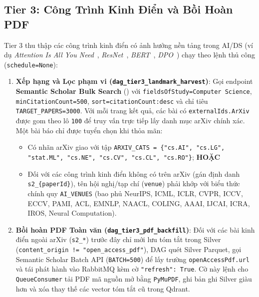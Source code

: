 \subsection{Tier 3: Công Trình Kinh Điển và Bồi Hoàn PDF}
\label{sec:ch2_tier3}

Tier 3 thu thập các công trình kinh điển có ảnh hưởng nền tảng trong AI/DS (ví dụ \textit{Attention Is All You Need}~\cite{vaswani2017attention}, \textit{ResNet}~\cite{he2016deep}, \textit{BERT}~\cite{devlin2019bert}, \textit{DPO}~\cite{rafailov2023direct}) chạy theo lệnh thủ công (\texttt{schedule=None}):
\begin{enumerate}[label=\textbf{\arabic*.}]
  \item \textbf{Xếp hạng và Lọc phạm vi (\texttt{dag\_tier3\_landmark\_harvest})}: Gọi endpoint \textbf{Semantic Scholar Bulk Search} () với \texttt{fieldsOfStudy=Computer Science}, \texttt{minCitationCount=500}, \texttt{sort=citationCount:desc} và chỉ tiêu \texttt{TARGET\_PAPERS=3000}. Với mỗi trang kết quả, các bài có \texttt{externalIds.ArXiv} được gom theo lô \texttt{100} để truy vấn trực tiếp  lấy danh mục arXiv chính xác. Một bài báo chỉ được tuyển chọn khi thỏa mãn:
    \begin{itemize}
      \item Có nhãn arXiv giao với tập \texttt{ARXIV\_CATS = \{"cs.AI", "cs.LG", "stat.ML", "cs.NE", "cs.CV", "cs.CL", "cs.RO"\}}; \textbf{HOẶC}
      \item Đối với các công trình kinh điển không có trên arXiv (gán định danh \texttt{s2\_\{paperId\}}), tên hội nghị/tạp chí (\texttt{venue}) phải khớp với biểu thức chính quy \texttt{AI\_VENUES} (bao phủ NeurIPS, ICML, ICLR, CVPR, ICCV, ECCV, PAMI, ACL, EMNLP, NAACL, COLING, AAAI, IJCAI, ICRA, IROS, Neural Computation).
    \end{itemize}
  \item \textbf{Bồi hoàn PDF Toàn văn (\texttt{dag\_tier3\_pdf\_backfill})}: Đối với các bài kinh điển ngoài arXiv (\texttt{s2\_*}) trước đây chỉ mới lưu tóm tắt trong Silver (\texttt{content\_origin != "open\_access\_pdf"}), DAG quét Silver Parquet, gọi Semantic Scholar Batch API (\texttt{BATCH=500}) để lấy trường \texttt{openAccessPdf.url} và tái phát hành vào RabbitMQ kèm cờ \texttt{"refresh": True}. Cờ này lệnh cho \texttt{QueueConsumer} tải PDF mã nguồn mở bằng \texttt{PyMuPDF}, ghi bản ghi Silver giàu hơn và xóa thay thế các vector tóm tắt cũ trong Qdrant.
\end{enumerate}

